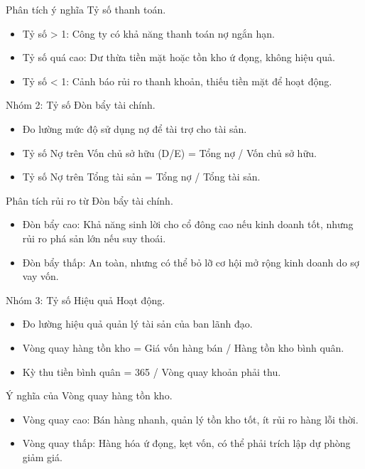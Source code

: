 \documentclass[aspectratio=169]{beamer}
\begin{document}
\begin{frame}{Phân tích ý nghĩa Tỷ số thanh toán.}
    \begin{itemize}
        \item Tỷ số > 1: Công ty có khả năng thanh toán nợ ngắn hạn.
        \item Tỷ số quá cao: Dư thừa tiền mặt hoặc tồn kho ứ đọng, không hiệu quả.
        \item Tỷ số < 1: Cảnh báo rủi ro thanh khoản, thiếu tiền mặt để hoạt động.
    \end{itemize}
\end{frame}


\begin{frame}{Nhóm 2: Tỷ số Đòn bẩy tài chính.}
    \begin{itemize}
        \item Đo lường mức độ sử dụng nợ để tài trợ cho tài sản.
        \item Tỷ số Nợ trên Vốn chủ sở hữu (D/E) = Tổng nợ / Vốn chủ sở hữu.
        \item Tỷ số Nợ trên Tổng tài sản = Tổng nợ / Tổng tài sản.
    \end{itemize}
\end{frame}


\begin{frame}{Phân tích rủi ro từ Đòn bẩy tài chính.}
    \begin{itemize}
        \item Đòn bẩy cao: Khả năng sinh lời cho cổ đông cao nếu kinh doanh tốt, nhưng rủi ro phá sản lớn nếu suy thoái.
        \item Đòn bẩy thấp: An toàn, nhưng có thể bỏ lỡ cơ hội mở rộng kinh doanh do sợ vay vốn.
    \end{itemize}
\end{frame}


\begin{frame}{Nhóm 3: Tỷ số Hiệu quả Hoạt động.}
    \begin{itemize}
        \item Đo lường hiệu quả quản lý tài sản của ban lãnh đạo.
        \item Vòng quay hàng tồn kho = Giá vốn hàng bán / Hàng tồn kho bình quân.
        \item Kỳ thu tiền bình quân = 365 / Vòng quay khoản phải thu.
    \end{itemize}
\end{frame}


\begin{frame}{Ý nghĩa của Vòng quay hàng tồn kho.}
    \begin{itemize}
        \item Vòng quay cao: Bán hàng nhanh, quản lý tồn kho tốt, ít rủi ro hàng lỗi thời.
        \item Vòng quay thấp: Hàng hóa ứ đọng, kẹt vốn, có thể phải trích lập dự phòng giảm giá.
    \end{itemize}
\end{frame}
\end{document}
